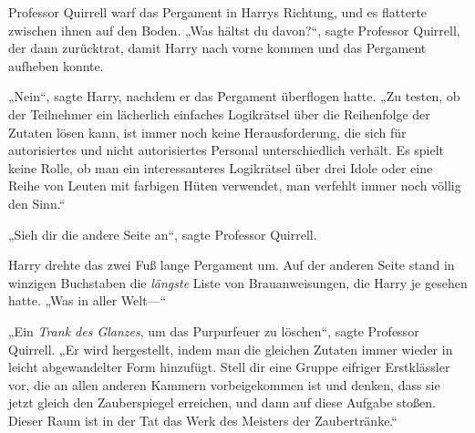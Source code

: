 Professor Quirrell warf das Pergament in Harrys Richtung, und es flatterte zwischen ihnen auf den Boden.
„Was hältst du davon?“, sagte Professor Quirrell, der dann zurücktrat, damit Harry nach vorne kommen und das Pergament aufheben konnte.

„Nein“, sagte Harry, nachdem er das Pergament überflogen hatte. „Zu testen, ob der Teilnehmer ein lächerlich einfaches Logikrätsel über die Reihenfolge der Zutaten lösen kann, ist immer noch keine Herausforderung, die sich für autorisiertes und nicht autorisiertes Personal unterschiedlich verhält. Es spielt keine Rolle, ob man ein interessanteres Logikrätsel über drei Idole oder eine Reihe von Leuten mit farbigen Hüten verwendet, man verfehlt immer noch völlig den Sinn.“

„Sieh dir die andere Seite an“, sagte Professor Quirrell.

Harry drehte das zwei Fuß lange Pergament um.
Auf der anderen Seite stand in winzigen Buchstaben die \emph{längste} Liste von Brauanweisungen, die Harry je gesehen hatte. „Was in aller Welt—“

„Ein \emph{Trank des Glanzes}, um das Purpurfeuer zu löschen“, sagte Professor Quirrell.
„Er wird hergestellt, indem man die gleichen Zutaten immer wieder in leicht abgewandelter Form hinzufügt. Stell dir eine Gruppe eifriger Erstklässler vor, die an allen anderen Kammern vorbeigekommen ist und denken, dass sie jetzt gleich den Zauberspiegel erreichen, und dann auf diese Aufgabe stoßen. Dieser Raum ist in der Tat das Werk des Meisters der Zaubertränke.“

